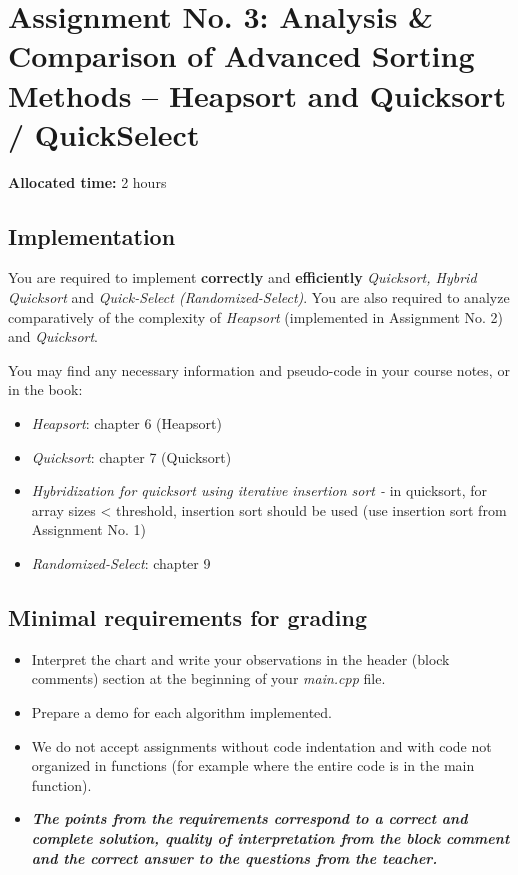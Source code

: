 \documentclass[../en-fa-lab.tex]{subfiles}
\begin{document}
\section{\texorpdfstring{\textbf{Assignment No. 3: Analysis \& Comparison of Advanced Sorting
Methods -- Heapsort and Quicksort / QuickSelect}}{Assignment No. 3: Analysis \& Comparison of Advanced Sorting
Methods -- Heapsort and Quicksort / QuickSelect}}\label{assign3}

\textbf{Allocated time:} 2 hours

\subsection{Implementation}\label{implementation}

You are required to implement \textbf{correctly} and
\textbf{efficiently} \emph{Quicksort, Hybrid Quicksort} and
\emph{Quick-Select (Randomized-Select)}. You are also required to
analyze comparatively of the complexity of \emph{Heapsort} (implemented
in Assignment No. 2) and \emph{Quicksort}.

You may find any necessary information and pseudo-code in
your course notes, or in the book\citep{cormen}:

\begin{itemize}
\item
  \emph{Heapsort}: chapter 6 (Heapsort)
\item
  \emph{Quicksort}: chapter 7 (Quicksort)
\item
  \emph{Hybridization for quicksort using iterative
  insertion sort -} in quicksort, for array sizes \textless{} threshold,
  insertion sort should be used (use insertion sort from Assignment No.
  1)
\item
  \emph{Randomized-Select}: chapter 9
\end{itemize}

\subsection{Minimal requirements for
grading}\label{minimal-requirements-for-grading}

\begin{itemize}
\item
  Interpret the chart and write your observations in the header (block
  comments) section at the beginning of your \emph{main.cpp} file.
\end{itemize}

\begin{itemize}
\item
  Prepare a demo for each algorithm implemented.
\item
  We do not accept assignments without code indentation and with code
  not organized in functions (for example where the entire code is in
  the main function).
\item
  \emph{\textbf{The points from the requirements correspond to a correct
  and complete solution, quality of interpretation from the block
  comment and the correct answer to the questions from the teacher.}}
\end{itemize}
\end{document}
